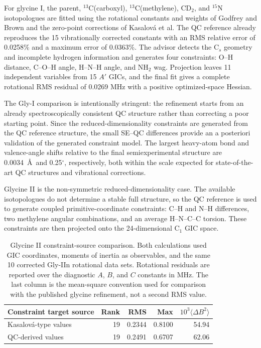\documentclass[aip,jcp,reprint,longbibliography,floatfix]{revtex4-2}
\begin{document}
For glycine I, the parent, $^{13}$C(carboxyl), $^{13}$C(methylene), CD$_2$,
and $^{15}$N isotopologues are fitted using the rotational constants and
weights of Godfrey and Brown\cite{GodfreyBrown1995ShapeGlycine} and the
zero-point corrections of Kasalov{\'a} et al.\cite{Kasalova2007Glycine} The
QC reference already reproduces the 15 vibrationally corrected constants
with an RMS relative error of 0.0258\% and a maximum error of 0.0363\%. The
advisor detects the C$_s$ geometry and incomplete hydrogen information and
generates four constraints: O--H distance, C--O--H angle, H--N--H angle, and
NH$_2$ wag. Projection leaves 11 independent variables from 15 $A'$ GICs, and
the final fit gives a complete rotational RMS residual of 0.0269 MHz with a
positive optimized-space Hessian.



The Gly-I comparison is intentionally stringent: the refinement starts from an already
spectroscopically consistent QC structure rather than correcting a poor
starting point. Since the reduced-dimensionality constraints are generated
from the QC reference structure, the small SE--QC differences provide an
a posteriori validation of the generated constraint model. The
largest heavy-atom bond and valence-angle shifts relative to the final
semiexperimental structure are 0.0034~\AA\ and 0.25$^\circ$, respectively,
both within the scale expected for state-of-the-art QC structures and vibrational
corrections.\cite{PuzzariniStanton2023,Mendolicchio2025FastDvib}

Glycine II is the non-symmetric reduced-dimensionality case. The available
isotopologues do not determine a stable full structure, so the QC reference
is used to generate coupled primitive-coordinate constraints: C--H and N--H
differences, two methylene angular combinations, and an average H--N--C--C
torsion. These constraints are then projected onto the
24-dimensional C$_1$ GIC space.

\begin{table}[!htb]
\caption{Glycine II constraint-source comparison. Both calculations used GIC coordinates, moments of inertia as observables, and the same 10 corrected Gly-IIn rotational data sets. Rotational residuals are reported over the diagnostic $A$, $B$, and $C$ constants in MHz. The last column is the mean-square convention used for comparison with the published glycine refinement, not a second RMS value.}
\label{tab:glycine-constraint-comparison}
\begin{tabular}{lrrrr}
\toprule
Constraint target source & Rank & RMS & Max & $10^3\langle\Delta B^2\rangle$ \\
\midrule
Kasalov{\'a}-type values & 19 & 0.2344 & 0.8100 & 54.94 \\
QC-derived values & 19 & 0.2491 & 0.6707 & 62.06 \\
\bottomrule
\end{tabular}
\end{table}
\end{document}
